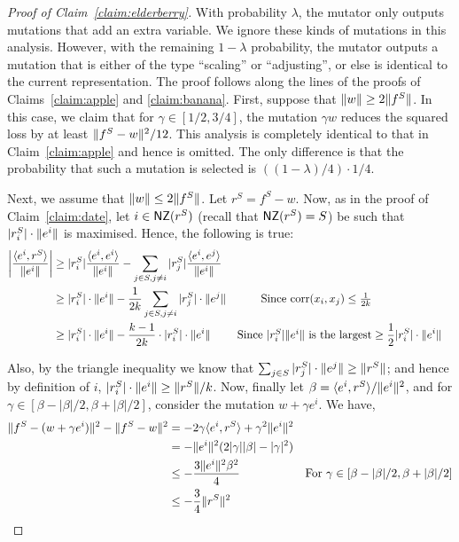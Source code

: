 \begin{proof}[Proof of Claim~\ref{claim:elderberry}] With probability $\lambda$,
the mutator only outputs mutations that add an extra variable. We ignore these
kinds of mutations in this analysis. However, with the remaining $1 - \lambda$
probability, the mutator outputs a mutation that is either of the type
``scaling'' or ``adjusting'', or else is identical to the current
representation. The proof follows along the lines of the proofs of
Claims~\ref{claim:apple} and \ref{claim:banana}. First, suppose that
$\Vert w \Vert \geq 2 \Vert f^S \Vert$. In this case, we claim that for $\gamma
\in [1/2, 3/4]$, the mutation $\gamma w$ reduces the squared loss by at least
$\Vert f^S - w \Vert^2/12$. This analysis is completely identical to that in
Claim~\ref{claim:apple} and hence is omitted.  The only difference is that the
probability that such a mutation is selected is $((1 - \lambda)/4) \cdot 1/4$. 

Next, we assume that $\Vert w \Vert \leq 2 \Vert f^S \Vert$. Let $r^S = f^S - w$.
Now, as in the proof of Claim~\ref{claim:date}, let $i \in \mathsf{NZ}(r^S)$ (recall
that $\mathsf{NZ}(r^S) = S$) be such that $|r^S_i| \cdot \Vert e^i \Vert$ is maximised.
Hence, the following is true:
\begin{align*}
\left| \frac{\langle e^i, r^S \rangle}{\Vert e^i \Vert} \right| &\geq |r^S_i|
\frac{\langle e^i, e^i \rangle}{\Vert e^i \Vert} - \sum_{j \in S, j \neq i} |r^S_j|
\frac{\langle e^i, e^j \rangle}{\Vert e^i \Vert} \\
&\geq |r^S_i| \cdot \Vert e^i \Vert - \frac{1}{2k} \sum_{j \in S, j \neq i}
|r^S_j| \cdot \Vert e^j \Vert &\mbox{Since $\mathrm{corr}(x_i, x_j) \leq \frac{1}{2k}$}
\\
&\geq |r^S_i| \cdot \Vert e^i \Vert - \frac{k-1}{2k} \cdot |r^S_i| \cdot
\Vert e^i \Vert & \mbox{Since $|r^S_i| \Vert e^i \Vert$ is the largest}
&\geq \frac{1}{2} |r^S_i| \cdot \Vert e^i \Vert 
\end{align*}

Also, by the triangle inequality we know that $\sum_{j \in S} |r^S_j| \cdot
\Vert e^j \Vert \geq \Vert r^S \Vert$; and hence by definition of $i$, $|r^S_i|
\cdot \Vert e^i \Vert \geq \Vert r^S \Vert/k$. Now, finally let $\beta =
\langle e^i, r^S \rangle/\Vert e^i \Vert^2$, and for $\gamma \in [\beta - |\beta|/2, \beta +
|\beta|/2]$, consider the mutation $w + \gamma e^i$. We have,
\begin{align*}
\Vert f^S - (w + \gamma e^i) \Vert^2 - \Vert f^S - w \Vert^2 &= -2 \gamma
\langle e^i, r^S \rangle + \gamma^2 \Vert e^i \Vert^2 \\
&= - \Vert e^i \Vert^2(2 |\gamma| |\beta| - |\gamma|^2) \\
&\leq - \frac{ 3 \Vert e^i \Vert^2 \beta^2}{4} &\mbox{For $\gamma \in [\beta -
|\beta|/2, \beta + |\beta|/2]$} \\
&\leq - \frac{3}{4} \Vert r^S \Vert^2
\end{align*}


\end{proof}
